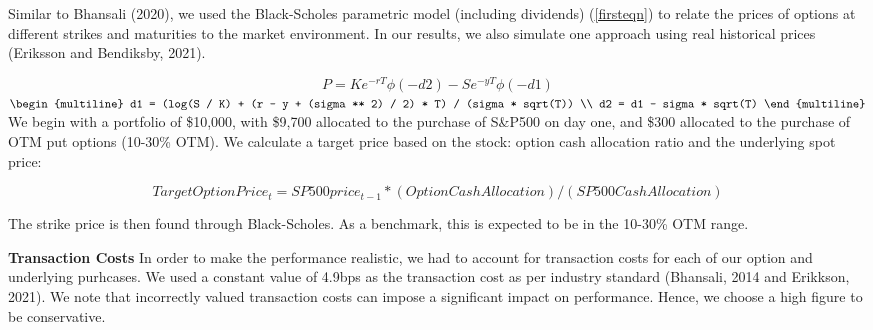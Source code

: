 \documentclass[12pt]{article}
\begin{document}
{{Similar to Bhansali (2020), we used the Black-Scholes parametric model (including dividends) (\ref{firsteqn}) to relate the prices of options at different strikes and maturities to the market environment. In our results, we also simulate one approach using real historical prices (Eriksson and Bendiksby, 2021).

\begin{equation}\label{firsteqn}
P = Ke^{-rT}\phi(-d2) - Se^{-yT}\phi(-d1)
\end{equation}
\begin{math}
\begin{multiline}
d1 = (log(S / K) + (r - y + (sigma ** 2) / 2) * T) / (sigma * sqrt(T)) \\
d2 = d1 - sigma * sqrt(T)
\end{multiline}
\end{math} \\




We begin with a portfolio of \$10,000, with \$9,700 allocated to the purchase of S\&P500 on day one, and \$300 allocated to the purchase of OTM put options (10-30\% OTM). We calculate a target price based on the stock: option cash allocation ratio and the underlying spot price:

\begin{equation}
TargetOptionPrice_{t} = SP500price_{t-1} * (OptionCashAllocation)/(SP500CashAllocation)
\end{equation}

The strike price is then found through Black-Scholes. As a benchmark, this is expected to be in the 10-30\% OTM range. 

\textbf{Transaction Costs}
In order to make the performance realistic, we had to account for transaction costs for each of our option and underlying purhcases. We used a constant value of 4.9bps as the transaction cost as per industry standard (Bhansali, 2014 and Erikkson, 2021). We note that incorrectly valued transaction costs can impose a significant impact on performance. Hence, we choose a high figure to be conservative. 

}}
\end{document}

